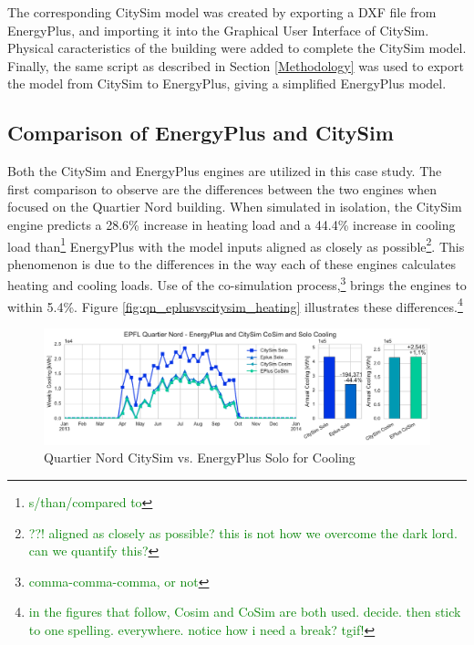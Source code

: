 \documentclass{tBPS2e}
\theoremstyle{plain}
\theoremstyle{definition}
\theoremstyle{remark}
\newcommand{\noteDT}[1]{\footnote{\textcolor{green}{#1}}}
\begin{document}
The corresponding CitySim model was created by exporting a DXF file from EnergyPlus, and importing it into the Graphical User Interface of CitySim. Physical caracteristics of the building were added to complete the CitySim model. Finally, the same script as described in Section \ref{Methodology} was used to export the model from CitySim to EnergyPlus, giving a simplified EnergyPlus model.\\



\subsection{Comparison of EnergyPlus and CitySim}

Both the CitySim and EnergyPlus engines are utilized in this case study. The first comparison to observe are the differences between the two engines when focused on the Quartier Nord building. When simulated in isolation, the CitySim engine predicts a 28.6\% increase in heating load and a 44.4\% increase in cooling load than\noteDT{s/than/compared to} EnergyPlus with the model inputs aligned as closely as possible\noteDT{??! aligned as closely as possible? this is not how we overcome the dark lord. can we quantify this?}. This phenomenon is due to the differences in the way each of these engines calculates heating and cooling loads. Use of the co-simulation process,\noteDT{comma-comma-comma, or not} brings the engines to within 5.4\%. Figure \ref{fig:qn_eplusvscitysim_heating} illustrates these differences.\noteDT{in the figures that follow, Cosim and CoSim are both used. decide. then stick to one spelling. everywhere. notice how i need a break? tgif!}

\begin{figure}[H]
\centering
\includegraphics[scale=0.55]{figures/QN_Cooling}
\caption{Quartier Nord CitySim vs. EnergyPlus Solo for Cooling}
\label{fig:qn_eplusvscitysim_cooling}
\end{figure}
\end{document}
